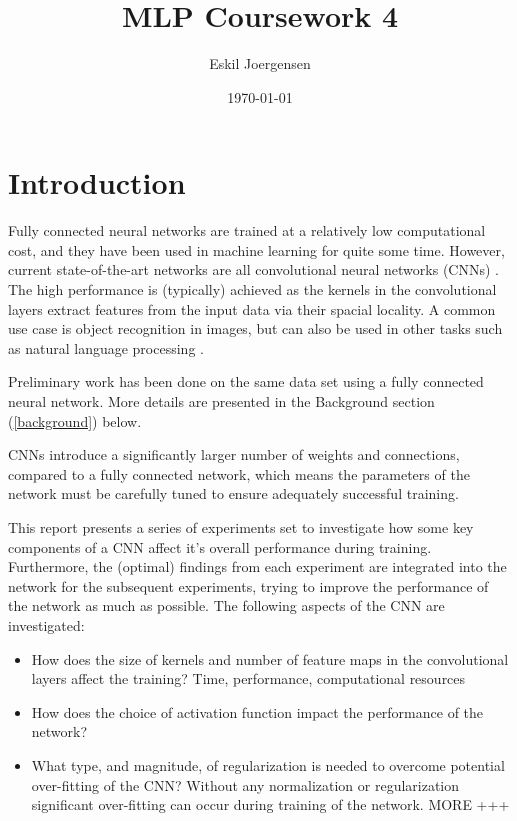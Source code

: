 \documentclass[]{article}
\title{MLP Coursework 4}
\author{Eskil Joergensen}
\date{\today}
\begin{document}
\maketitle

\section{Introduction}

Fully connected neural networks are trained at a relatively low computational cost, and they have been used in machine learning for quite some time. However, current state-of-the-art networks are all convolutional neural networks (CNNs) \cite{long2015fully}. The high performance is (typically) achieved as the kernels in the convolutional layers extract features from the input data via their spacial locality. A common use case is object recognition in images, but can also be used in other tasks such as natural language processing \cite{Collobert}. 

Preliminary work has been done on the same data set using a fully connected neural network. More details are presented in the Background section (\ref{background}) below. 

CNNs introduce a significantly larger number of weights and connections, compared to a fully connected network, which means the parameters of the network must be carefully tuned to ensure adequately successful training. 

This report presents a series of experiments set to investigate how some key components of a CNN affect it's overall performance during training. Furthermore, the (optimal) findings from each experiment are integrated into the network for the subsequent experiments, trying to improve the performance of the network as much as possible. The following aspects of the CNN are investigated:

\begin{itemize}
	
	\item How does the size of kernels and number of feature maps in the convolutional layers affect the training? Time, performance, computational resources
	
	\item How does the choice of activation function impact the performance of the network?
	
	\item What type, and magnitude, of regularization is needed to overcome potential over-fitting of the CNN? Without any normalization or regularization significant over-fitting can occur during training of the network. MORE +++
	
\end{itemize}
\end{document}
